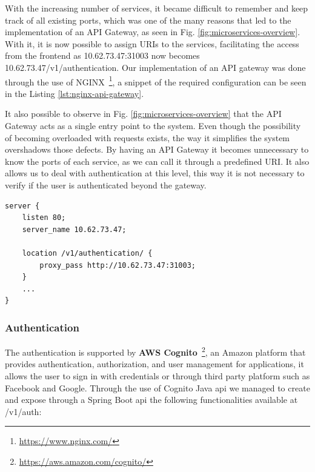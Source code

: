With the increasing number of services, it became difficult to remember and keep track of all existing ports, which was one of the many reasons that led to the implementation of an API Gateway, as seen in Fig. \ref{fig:microservices-overview}. With it, it is now possible to assign URIs to the services, facilitating the access from the frontend as 10.62.73.47:31003 now becomes 10.62.73.47/v1/authentication. Our implementation of an API gateway was done through the use of NGINX~\footnote{\url{https://www.nginx.com/}}, a snippet of the required configuration can be seen in the Listing \ref{lst:nginx-api-gateway}.

It also possible to observe in Fig. \ref{fig:microservices-overview} that the API Gateway acts as a single entry point to the system. Even though the possibility of becoming overloaded with requests exists, the way it simplifies the system overshadows those defects. By having an API Gateway it becomes unnecessary to know the ports of each service, as we can call it through a predefined URI. It also allows us to deal with authentication at this level, this way it is not necessary to verify if the user is authenticated beyond the gateway.

\begin{lstlisting}[float, caption={NGINX API Gateway snippet}, label={lst:nginx-api-gateway}, captionpos=t]
server {
    listen 80;
    server_name 10.62.73.47;

    location /v1/authentication/ {
        proxy_pass http://10.62.73.47:31003;
    }
    ...
}
\end{lstlisting}


\subsubsection{Authentication}

The authentication is supported by \textbf{AWS Cognito}~\footnote{\url{https://aws.amazon.com/cognito/}}, an Amazon platform that provides authentication, authorization, and user management for applications, it allows the user to sign in with credentials or through third party platform such as Facebook and Google. Through the use of Cognito Java \acrshort{api} we managed to create and expose through a Spring Boot \acrshort{api} the following functionalities available at /v1/auth:

